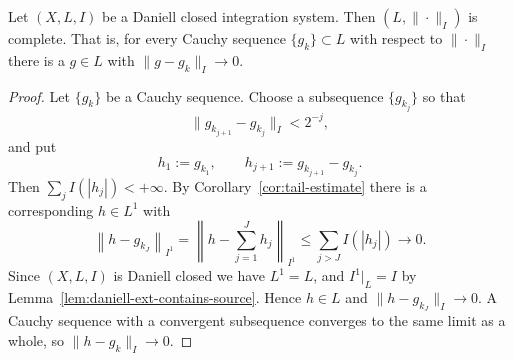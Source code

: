 \begin{theorem}\label{thm:l1-norm-complete}
  Let $(X,L,I)$ be a Daniell closed integration system.
  Then $(L,\|\cdot\|_I)$ is complete.
  That is, for every Cauchy sequence $\{g_k\}\subset L$ with respect to
  $\|\cdot\|_I$ there is a $g\in L$ with $\|g-g_k\|_I\to0$.
\end{theorem}
\begin{proof}
  Let $\{g_k\}$ be a Cauchy sequence. Choose a subsequence $\{g_{k_j}\}$ so that
  \[
    \|g_{k_{j+1}}-g_{k_j}\|_I<2^{-j} ,
  \]
  and put
  \[
    h_1:=g_{k_1},\qquad h_{j+1}:=g_{k_{j+1}}-g_{k_j} .
  \]
  Then $\sum_j I(|h_j|)<+\infty$.
  By Corollary~\ref{cor:tail-estimate} there is a corresponding $h\in L^1$ with
  \[
    \left\|h-g_{k_J}\right\|_{I^1}
    =\left\|h-\sum_{j=1}^{J}h_j\right\|_{I^1}
    \le\sum_{j>J}I(|h_j|)
    \longrightarrow0 .
  \]
  Since $(X,L,I)$ is Daniell closed we have $L^1=L$, and
  $I^1|_L=I$ by Lemma~\ref{lem:daniell-ext-contains-source}.
  Hence $h\in L$ and $\|h-g_{k_J}\|_I\to0$.
  A Cauchy sequence with a convergent subsequence converges to the same limit as
  a whole, so $\|h-g_k\|_I\to0$.
\end{proof}
